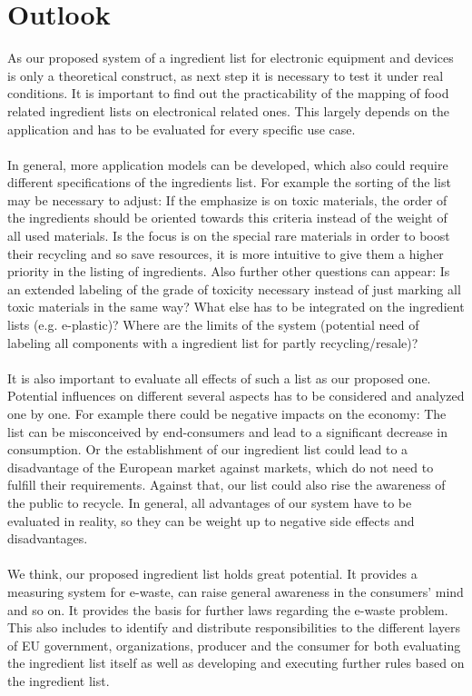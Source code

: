 \section{Outlook}
As our proposed system of a ingredient list for electronic equipment and devices is only a theoretical construct, as next step it is necessary to test it under real conditions. It is important to find out the practicability of the mapping of food related ingredient lists on electronical related ones. This largely depends on the application and has to be evaluated for every specific use case.\\
\\
In general, more application models can be developed, which also could require different specifications of the ingredients list. For example the sorting of the list may be necessary to adjust: If the emphasize is on toxic materials, the order of the ingredients should be oriented towards this criteria instead of the weight of all used materials. Is the focus is on the special rare materials in order to boost their recycling and so save resources, it is more intuitive to give them a higher priority in the listing of ingredients. Also further other questions can appear: Is an extended labeling of the grade of toxicity necessary instead of just marking all toxic materials in the same way? What else has to be integrated on the ingredient lists (e.g. e-plastic)? Where are the limits of the system (potential need of labeling all components with a ingredient list for partly recycling/resale)?\\
\\
It is also important to evaluate all effects of such a list as our proposed one. Potential influences on different several aspects has to be considered and analyzed one by one. For example there could be negative impacts on the economy: The list can be misconceived by end-consumers and lead to a significant decrease in consumption. Or the establishment of our ingredient list could lead to a disadvantage of the European market against markets, which do not need to fulfill their requirements. Against that, our list could also rise the awareness of the public to recycle. In general, all advantages of our system have to be evaluated in reality, so they can be weight up to negative side effects and disadvantages.\\
\\
We think, our proposed ingredient list holds great potential. It provides a measuring system for e-waste, can raise general awareness in the consumers' mind and so on. It provides the basis for further laws regarding the e-waste problem. This also includes to identify and distribute responsibilities to the different layers of EU government, organizations, producer and the consumer for both evaluating the ingredient list itself as well as developing and executing further rules based on the ingredient list.\\
